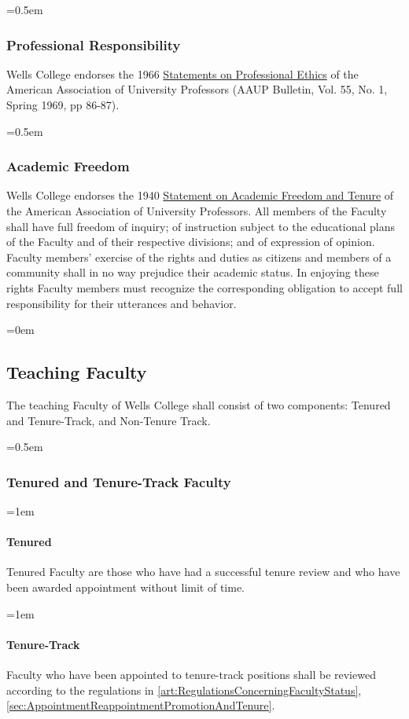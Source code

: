 \documentclass{manual}
\let\oldsubsection\subsection
\renewcommand\subsection{\leftskip=0em\oldsubsection}
\let\oldsubsubsection\subsubsection
\renewcommand\subsubsection{\leftskip=0.5em\oldsubsubsection}
\let\oldparagraph\paragraph
\renewcommand\paragraph{\leftskip=1em\oldparagraph}
\begin{document}
\subsubsection{Professional Responsibility}
Wells College endorses the 1966 \href{http://www.aaup.org/AAUP/pubsres/policydocs/contents/statementonprofessionalethics.htm}{Statements on Professional Ethics} of the American Association of University Professors (AAUP Bulletin, Vol. 55, No. 1, Spring 1969, pp 86-87).

\subsubsection{Academic Freedom} \label{sub:AcademicFreedom}
Wells College endorses the 1940 \href{http://www.aaup.org/AAUP/pubsres/policydocs/contents/1940statement.htm}{Statement on Academic Freedom and Tenure} of the American Association of University Professors. All members of the Faculty shall have full freedom of inquiry; of instruction subject to the educational plans of the Faculty and of their respective divisions; and of expression of opinion. Faculty members' exercise of the rights and duties as citizens and members of a community shall in no way prejudice their academic status. In enjoying these rights Faculty members must recognize the corresponding obligation to accept full responsibility for their utterances and behavior.

\subsection{Teaching Faculty}\label{sec:TeachingFaculty}
The teaching Faculty of Wells College shall consist of two components: Tenured and Tenure-Track, and Non-Tenure Track.

\subsubsection{Tenured and Tenure-Track Faculty}\label{sub:Core}

\paragraph{Tenured} 
Tenured Faculty are those who have had a successful tenure review and who have been awarded appointment without limit of time.

\paragraph{Tenure-Track} 
Faculty who have been appointed to tenure-track positions shall be reviewed according to the regulations in \cref{art:RegulationsConcerningFacultyStatus}, \cref{sec:AppointmentReappointmentPromotionAndTenure}. 
\end{document}
